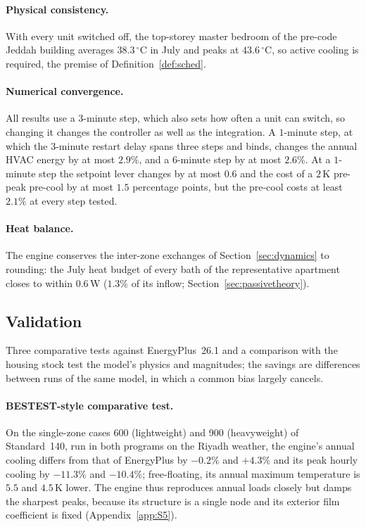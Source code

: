 \documentclass[10pt,a4paper,twocolumn]{article}
\theoremstyle{definition}
\begin{document}
\paragraph{Physical consistency.} With every unit switched off, the top-storey master bedroom of the pre-code Jeddah building averages $38.3\,^{\circ}$C in July and peaks at $43.6\,^{\circ}$C, so active cooling is required, the premise of Definition~\ref{def:sched}.

\paragraph{Numerical convergence.}\label{sec:convergence} All results use a $3$-minute step, which also sets how often a unit can switch, so changing it changes the controller as well as the integration. A $1$-minute step, at which the $3$-minute restart delay spans three steps and binds, changes the annual HVAC energy by at most $2.9\%$, and a $6$-minute step by at most $2.6\%$. At a $1$-minute step the setpoint lever changes by at most $0.6$ and the cost of a $2\,$K pre-peak pre-cool by at most $1.5$ percentage points, but the pre-cool costs at least $2.1\%$ at every step tested.

\paragraph{Heat balance.} The engine conserves the inter-zone exchanges of Section~\ref{sec:dynamics} to rounding: the July heat budget of every bath of the representative apartment closes to within $0.6\,$W ($1.3\%$ of its inflow; Section~\ref{sec:passivetheory}).

\subsection{Validation}\label{sec:validation}
Three comparative tests against EnergyPlus~26.1 and a comparison with the housing stock test the model's physics and magnitudes; the savings are differences between runs of the same model, in which a common bias largely cancels.

\paragraph{BESTEST-style comparative test.} On the single-zone cases 600 (lightweight) and 900 (heavyweight) of Standard~140, run in both programs on the Riyadh weather, the engine's annual cooling differs from that of EnergyPlus by $-0.2\%$ and $+4.3\%$ and its peak hourly cooling by $-11.3\%$ and $-10.4\%$; free-floating, its annual maximum temperature is $5.5$ and $4.5\,$K lower. The engine thus reproduces annual loads closely but damps the sharpest peaks, because its structure is a single node and its exterior film coefficient is fixed (Appendix~\ref{app:S5}).
\end{document}
